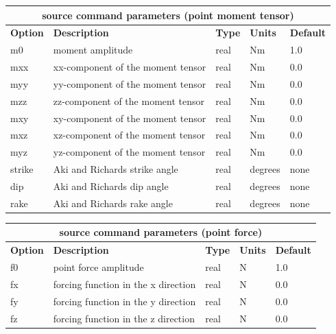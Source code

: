 \documentclass[11pt]{report}
\begin{document}
\begin{center}
\begin{tabular}{|l|p{8cm}|l|l|l|} \hline
\multicolumn{5}{|c|}{\bf source command parameters (point moment tensor)}\\ \hline
\bf{Option} & \bf{Description} & \bf{Type} & \bf{Units} & \bf{Default} \\ \hline \hline
m0 & moment amplitude & real & Nm & 1.0 \\ \hline
mxx & xx-component of the moment tensor & real & Nm & 0.0 \\ \hline
myy & yy-component of the moment tensor & real & Nm & 0.0 \\ \hline
mzz & zz-component of the moment tensor & real & Nm & 0.0 \\ \hline
mxy & xy-component of the moment tensor & real & Nm & 0.0 \\ \hline
mxz & xz-component of the moment tensor & real & Nm & 0.0 \\ \hline
myz & yz-component of the moment tensor & real & Nm & 0.0 \\ \hline
\hline
strike & Aki and Richards strike angle & real & degrees & none \\ \hline
dip & Aki and Richards dip angle & real & degrees & none \\ \hline
rake & Aki and Richards rake angle & real & degrees & none \\ \hline
\end{tabular}
\end{center}
\begin{center}
\begin{tabular}{|l|p{8cm}|l|l|l|} \hline
\multicolumn{5}{|c|}{\bf source command parameters (point force)}\\ \hline
\bf{Option} & \bf{Description} & \bf{Type} & \bf{Units} & \bf{Default} \\ \hline \hline
f0 & point force amplitude & real & N & 1.0 \\ \hline
fx & forcing function in the x direction & real & N & 0.0 \\ \hline
fy & forcing function in the y direction & real & N & 0.0 \\ \hline
fz & forcing function in the z direction & real & N & 0.0 \\ \hline
\end{tabular}
\end{center}
\end{document}
